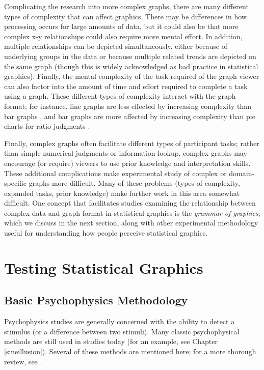 \documentclass[11pt]{isuthesis}\usepackage[]{graphicx}\usepackage[]{color}
\begin{document}
Complicating the research into more complex graphs, there are many different types of complexity that can affect graphics. There may be differences in how processing occurs for large amounts of data, but it could also be that more complex x-y relationships could also require more mental effort. In addition, multiple relationships can be depicted simultaneously, either because of underlying groups in the data or because multiple related trends are depicted on the same graph (though this is widely acknowledged as bad practice in statistical graphics). Finally, the mental complexity of the task required of the graph viewer can also factor into the amount of time and effort required to complete a task using a graph. These different types of complexity interact with the graph format; for instance, line graphs are less effected by increasing complexity than bar graphs \citep{tan1994human}, and bar graphs are more affected by increasing complexity than pie charts for ratio judgments \citep{hollands1998judging}. 

Finally, complex graphs often facilitate different types of participant tasks; rather than simple numerical judgments or information lookup, complex graphs may encourage (or require) viewers to use prior knowledge and interpretation skills. These additional complications make experimental study of complex or domain-specific graphs more difficult. Many of these problems (types of complexity, expanded tasks, prior knowledge) make further work in this area somewhat difficult. One concept that facilitates studies examining the relationship between complex data and graph format in statistical graphics is the \emph{grammar of graphics}, which we discuss in the next section, along with other experimental methodology useful for understanding how people perceive statistical graphics. 


\section{Testing Statistical Graphics}
\subsection{Basic Psychophysics Methodology}
Psychophysics studies are generally concerned with the ability to detect a stimulus (or a difference between two stimuli). Many classic psychophysical methods are still used in studies today (for an example, see Chapter \ref{sineillusion}). Several of these methods are mentioned here; for a more thorough review, see \citet{goldstein}. 
\end{document}
